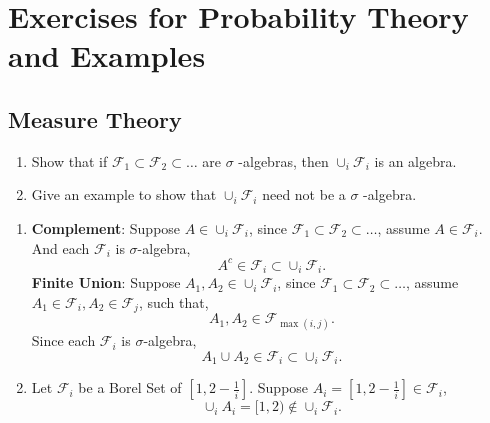 \chapter{Exercises for Probability Theory and Examples}

\section{Measure Theory}

\begin{exercise}
    \begin{enumerate}
        \item Show that if $\mathcal{F}_{1}\subset \mathcal{F}_{2}\subset\ldots$ are $\sigma$ -algebras, then $\cup_{i}\mathcal{F}_{i}$ is an algebra.
        \item Give an example to show that $\cup_{i}\mathcal{F}_{i}$ need not be a $\sigma$ -algebra.
    \end{enumerate}
\end{exercise}

\begin{solution}
    \begin{enumerate}
        \item
              \textbf{Complement}: Suppose $A\in\cup_{i}\mathcal{F}_{i}$, since $\mathcal{F}_{1}\subset \mathcal{F}_{2}\subset\ldots$, assume $A\in\mathcal{F}_{i}$. And each $\mathcal{F}_{i}$ is $\sigma$-algebra,
              \begin{equation*}
                  A^c\in\mathcal{F}_{i}\subset\cup_{i}\mathcal{F}_{i}.
              \end{equation*}
              \textbf{Finite Union}: Suppose $A_1,A_2\in\cup_{i}\mathcal{F}_{i}$, since $\mathcal{F}_{1}\subset \mathcal{F}_{2}\subset\ldots$, assume $A_1\in\mathcal{F}_{i},A_2\in\mathcal{F}_{j}$, such that,
              \begin{equation*}
                  A_1,A_2\in\mathcal{F}_{\max(i,j)}.
              \end{equation*}
              Since each $\mathcal{F}_{i}$ is $\sigma$-algebra,
              \begin{equation*}
                  A_1\cup A_2\in\mathcal{F}_{i}\subset\cup_{i}\mathcal{F}_{i}.
              \end{equation*}
        \item
              Let $\mathcal{F}_{i}$ be a Borel Set of $[1,2-\frac{1}{i}]$. Suppose $A_i=[1,2-\frac{1}{i}]\in\mathcal{F}_{i}$,
              \begin{equation*}
                  \cup_{i}A_{i}=[1,2)\notin\cup_{i}\mathcal{F}_{i}.
              \end{equation*}
    \end{enumerate}
\end{solution}

